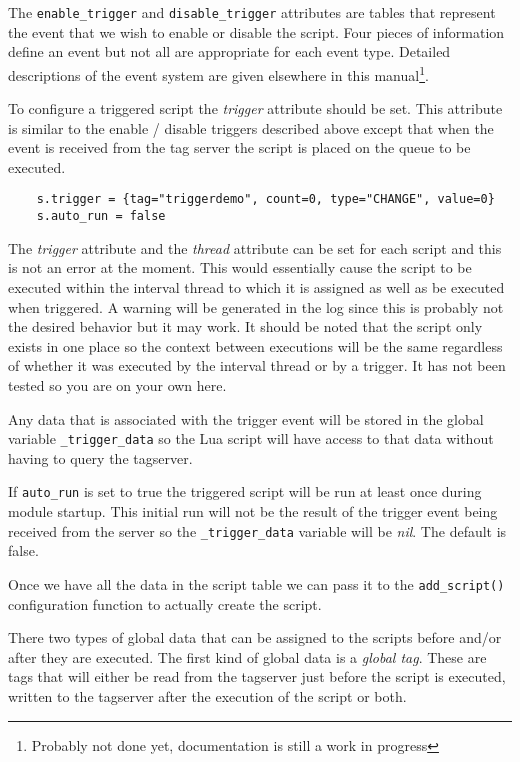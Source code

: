 The \texttt{enable\_trigger} and \texttt{disable\_trigger} attributes are tables that represent the \opendax
event that we wish to enable or disable the script.  Four pieces of information define an event but
not all are appropriate for each event type.  Detailed descriptions of the event system are given
elsewhere in this manual\footnote{Probably not done yet, documentation is still a work in progress}.

To configure a triggered script the \textit{trigger} attribute should be set.  This attribute is
similar to the enable / disable triggers described above except that when the event is received
from the tag server the script is placed on the queue to be executed.

\begin{verbatim}
	s.trigger = {tag="triggerdemo", count=0, type="CHANGE", value=0}
    s.auto_run = false
\end{verbatim}

The \textit{trigger} attribute and the \textit{thread} attribute can be set for each script and this
is not an error at the moment.  This would essentially cause the script to be executed within
the interval thread to which it is assigned as well as be executed when triggered.  A warning will
be generated in the log since this is probably not the desired behavior but it may work.  It should
be noted that the script only exists in one place so the context between executions will be the
same regardless of whether it was executed by the interval thread or by a trigger.  It has not
been tested so you are on your own here.

Any data that is associated with the trigger event will be stored in the global variable
\texttt{\_trigger\_data} so the Lua script will have access to that data without having to query
the tagserver.

If \texttt{auto\_run} is set to true the triggered script will be run at least once during
module startup.  This initial run will not be the result of the trigger event being received
from the server so the \texttt{\_trigger\_data} variable will be \textit{nil}.  The default
is false.

Once we have all the data in the script table we can pass it to the \texttt{add\_script()} configuration
function to actually create the script.

There two types of global data that can be assigned to the scripts before and/or after they are
executed.  The first kind of global data is a \textit{global tag}.  These are \opendax tags that will
either be read from the tagserver just before the script is executed, written to the tagserver
after the execution of the script or both.

